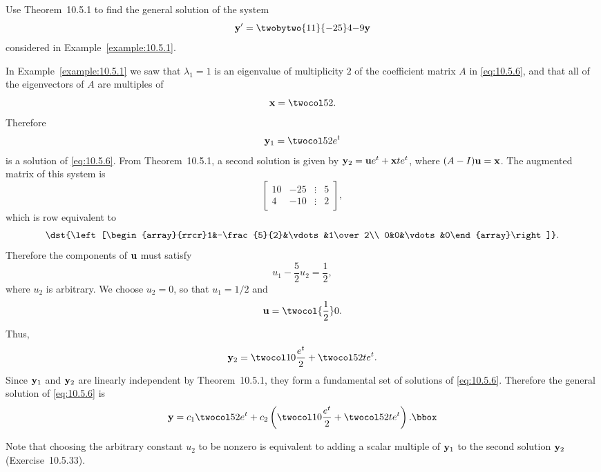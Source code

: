 \setcounter{example}{1}
\setcounter{equation}{5}
\begin{example}
  \label{example:10.5.2}\rm Use Theorem~10.5.1 to find the general solution of the
  system
  \begin{equation}
    \label{eq:10.5.6}{\bf y}'=\twobytwo{11}{-25}4{-9}{\bf y}
  \end{equation}
  considered in Example~\ref{example:10.5.1}.
\end{example}
\begin{examplesolution}
\solution In Example~\ref{example:10.5.1} we saw that $\lambda_{1}=1$ is an eigenvalue of
multiplicity $2$ of the coefficient matrix $A$ in \eqref{eq:10.5.6}, and that all of the
eigenvectors of $A$ are multiples of
\[
  {\bf x}=\twocol52.
\]
Therefore
\[
  {\bf y}_{1}=\twocol52e^{t}
\]
is a solution of \eqref{eq:10.5.6}. From Theorem~10.5.1, a second solution is given by
${\bf y}_{2}={\bf u}e^{t}+{\bf x}te^{t}$, where $(A-I){\bf u}={\bf x}$. The augmented matrix of this
system is
\[
  \left[
  \begin{array}{rrcr}
    10 & -25 & \vdots & 5 \\
    4  & -10 & \vdots & 2
  \end{array}\right],
\]
which is row equivalent to
\[
  \dst{\left[\begin{array}{rrcr}1&-\frac{5}{2}&\vdots&1\over2\\ 0&0&\vdots&0\end{array}\right]}.
\]
Therefore the components of ${\bf u}$ must satisfy
\[
  u_{1}-\frac{5}{2}u_{2}=\frac{1}{2},
\]
where $u_{2}$ is arbitrary. We choose $u_{2}=0$, so that $u_{1}=1/2$ and
\[
  {\bf u}=\twocol{\frac{1}{2}}0.
\]
Thus,
\[
  {\bf y}_{2}=\twocol10{\frac{e^{t}}{2}}+\twocol52te^{t}.
\]
Since ${\bf y}_{1}$ and ${\bf y}_{2}$ are linearly independent by Theorem~10.5.1, they
form a fundamental set of solutions of \eqref{eq:10.5.6}. Therefore the general solution of
\eqref{eq:10.5.6} is
\[
  {\bf y}=c_{1}\twocol52e^{t}+c_{2}\left(\twocol10{\frac{e^{t}}{2}}+\twocol52te^{t}\right).\bbox
\]

Note that choosing the arbitrary constant $u_{2}$ to be nonzero is equivalent to adding a scalar
multiple of ${\bf y}_{1}$ to the second solution ${\bf y}_{2}$ (Exercise~10.5.33).
\end{examplesolution}

